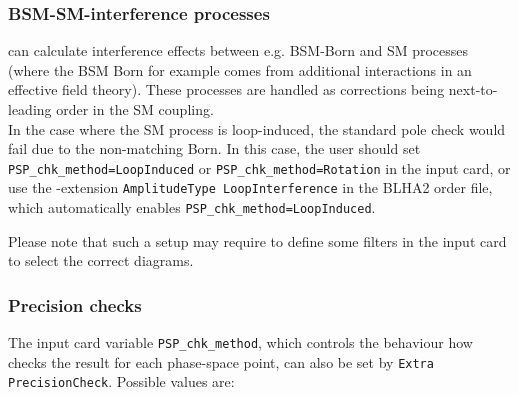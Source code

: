 
\subsubsection{BSM-SM-interference processes}
\gosam{} can calculate interference effects between e.g. BSM-Born and
SM processes
(where the BSM Born for example comes from additional interactions in an effective field theory).
These processes are handled as corrections being next-to-leading order
in the SM coupling. \\
In the case where the SM process is loop-induced, 
the standard  pole check would fail
due to the non-matching Born. In this case, the user should set \texttt{PSP\_chk\_method=LoopInduced}
or \texttt{PSP\_chk\_method=Rotation} in the \gosam{} input card,
or use the \gosam-extension \texttt{AmplitudeType LoopInterference} in the BLHA2 order file,
which automatically enables \texttt{PSP\_chk\_method=LoopInduced}.

Please note that such a setup may require
to define some filters in the input card to select the correct diagrams.

\subsubsection{Precision checks}

The \gosam{} input card variable \texttt{PSP\_chk\_method}, which
controls the behaviour how \gosam{} checks the result for each phase-space point,
can also be set by \texttt{Extra PrecisionCheck}.
Possible values are:

